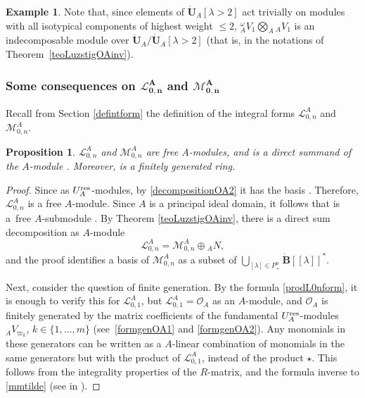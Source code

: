 \documentclass[10pt,a4paper]{amsart}
\numberwithin{equation}{section}
\newtheorem{prop}[teo]{Proposition}
\theoremstyle{definition}
\newtheorem{exa}[teo]{Example}
\newcommand{\Ll}{{\mathcal L}}
\newcommand{\Mm}{{\mathcal M}}
\newcommand{\Oo}{{\mathcal O}}
\begin{document}
\begin{exa}
{Note that, since elements of $\dot{\mathbf{U}}_A [\lambda > 2]$ act trivially on modules with all isotypical components of highest weight $\leq 2$, ${}_A^\omega V_1\bigotimes_A {}_AV_1$ is an indecomposable module over $\dot{\mathbf{U}}_A / \dot{\mathbf{U}}_A [\lambda > 2]$ (that is,  in the notations of Theorem~\ref{teoLuzstigOAinv}).}\end{exa}

\subsubsection[Some consequences on L\_{0,n}\^A and M\_{0,n}\^A]{Some consequences on $\boldsymbol{\Ll_{0,n}^A}$ and $\boldsymbol{\Mm_{0,n}^A}$}

Recall from Section \ref{defintform} the definition of the integral forms $\Ll_{0,n}^A$ and $\Mm_{0,n}^A$.
\begin{prop}\label{L0NAfgfree} $\Ll_{0,n}^A$ and $\Mm_{0,n}^A$ are free $A$-modules, and \smash{$\Mm_{0,n}^A$} is a direct summand of the $A$-module \smash{$\Ll_{0,n}^A$}. Moreover, \smash{$\Ll_{0,n}^A$} is a finitely generated ring.
\end{prop}
\begin{proof} Since \smash{$\Ll_{0,n}^A = \Oo_A^{\otimes n}$} as $U_A^{\rm res}$-modules, by \eqref{decompositionOA2} it has the basis . Therefore, $\Ll_{0,n}^A$ is a free $A$-module. Since $A$ is a principal ideal domain, it follows that \smash{$\Mm_{0,n}^A$} is a~free $A$-submodule \cite[Appendix~2.2]{Lang}. By Theorem \ref{teoLuzstigOAinv}, there is a direct sum decomposition as $A$-module
\begin{equation}\label{decomposition OAn}
\Ll_{0,n}^A = \Mm_{0,n}^A \oplus {}_AN,
\end{equation} and the proof identifies a basis of $\Mm_{0,n}^A$ as a subset of $\bigcup_{[\lambda]\in P_+^n}\dot{\mathbf{B}} [[\lambda]]^*$.

Next, consider the question of finite generation. By the formula \eqref{prodL0nform}, it is enough to verify this for ${\mathcal L}_{0,1}^A$, but ${\mathcal L}_{0,1}^A= \Oo_A$ as an $A$-module, and $\Oo_A$ is finitely generated by the matrix coefficients of the fundamental $U_A^{\rm res}$-modules ${}_AV_{\varpi_k}$, $k\in\{1,\dots,m\}$ (see~\eqref{formgenOA1} and \eqref{formgenOA2}). Any monomials in these generators can be written as a $A$-linear combination of monomials in the same generators but with the product of $\Ll_{0,1}^A$, instead of the product $\star$. This follows from the integrality properties of the $R$-matrix, and the formula inverse to \eqref{mmtilde} (see in \cite[Section 3.3 and the formulas (4.6)--(4.8)]{BR}).
\end{proof}
\end{document}
